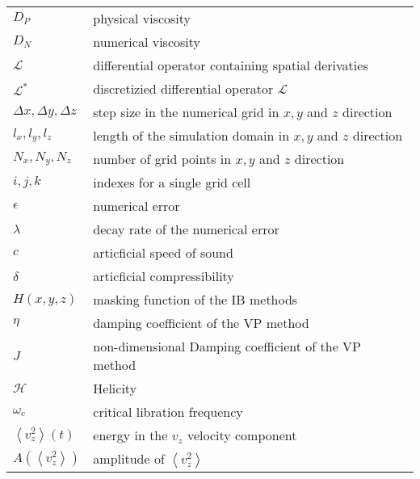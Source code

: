 \begin{longtable}[h]{p{}p{}}
  $D_P$ & physical viscosity\\
  $D_N$ & numerical viscosity\\


  $\mathcal{L}$ & differential operator containing spatial derivaties\\
  $\mathcal{L}^*$ & discretizied differential operator $\mathcal{L}$\\

  $\Delta x, \Delta y, \Delta z$ & step size in the numerical grid in $x, y$ and $z$ direction\\
  $l_x, l_y, l_z$ & length of the simulation domain in $x, y$ and $z$ direction\\
  $N_x, N_y, N_z$ & number of grid points in $x, y$ and $z$ direction\\
  $i, j, k$ & indexes for a single grid cell \\

  $\epsilon$ & numerical error\\
  $\lambda$ & decay rate of the numerical error\\

  $c$ & articficial speed of sound\\
  $\delta$ & articficial compressibility\\

  $H(x, y, z)$ & masking function of the IB methods\\
  $\eta$ & damping coefficient of the VP method\\
  $J$ & non-dimensional Damping coefficient of the VP method\\

  $\mathcal{H}$ & Helicity\\
  $\omega_c$ & critical libration frequency\\

  $\left<v_z^2\right>(t)$ & energy in the $v_z$ velocity component\\
  $A\left(\left<v_z^2\right> \right)$ & amplitude of $\left<v_z^2 \right>$ \\

\end{longtable}
